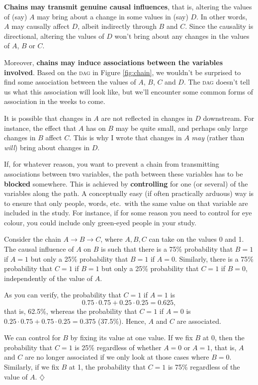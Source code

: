 \documentclass[a4paper]{tufte-book}\usepackage[]{graphicx}\usepackage[]{xcolor}
\newcommand{\term}[1]{\textbf{#1}}
\newcommand*{\parend}[1][$\diamondsuit$]{%
  \unskip\nobreak\hspace{1em plus 1fill}$\diamondsuit$%
}
\begin{document}
\textbf{Chains may transmit genuine causal influences}, that is, altering the values
of (say) $A$ may bring about a change in some values in (say) $D$. In other words,
$A$ may causally affect $D$, albeit indirectly through $B$ and $C$.
Since the causality is directional, altering the
values of $D$ won't bring about any changes in the values of $A$, $B$ or $C$.

Moreover, \textbf{chains may induce associations between the variables involved}.
Based on the \textsc{dag} in Figure \ref{fig:chain}, we wouldn't be surprised
to find some association
between the values of $A$, $B$, $C$ and $D$. The \textsc{dag}
doesn't tell us what this association will look like, but we'll encounter
some common forms of association in the weeks to come.

It is possible that changes in $A$ are not reflected in changes
in $D$ downstream.
For instance, the effect that $A$ has on $B$ may be quite small,
and perhaps only large changes in $B$ affect $C$.
This is why I wrote that changes in $A$ \emph{may} (rather than \emph{will})
bring about changes in $D$.

If, for whatever reason,
you want to prevent a chain from transmitting associations between two variables,
the path between these variables has to be \term{blocked} somewhere.
This is achieved by \term{controlling} for one (or several) of the variables
along the path.
A conceptually easy (if often practically arduous) way is to ensure that
only people, words, etc.\ with the same value on that variable are included in the
study.
For instance, if for some reason you need to control for eye colour, you could include
only green-eyed people in your study.

  Consider the chain $A \rightarrow B \rightarrow C$,
  where $A, B, C$ can take on the values 0 and 1.
  The causal influence of $A$ on $B$ is such that 
  there is a 75\% probability that $B = 1$ if $A = 1$
  but only a 25\% probability that $B = 1$ if $A = 0$.
  Similarly, there is a 75\% probability that $C = 1$ if $B = 1$
  but only a 25\% probability that $C = 1$ if $B = 0$,
  independently of the value of $A$.
  
  As you can verify, the probability that $C = 1$ if $A = 1$
  is 
  $$0.75 \cdot 0.75 + 0.25 \cdot 0.25 = 0.625,$$
  that is, 62.5\%,
  whereas the probability that $C = 1$ if $A = 0$
  is $0.25 \cdot 0.75 + 0.75 \cdot 0.25 = 0.375$ (37.5\%).
  Hence, $A$ and $C$ are associated.
  
  We can control for $B$ by fixing its value at one value.
  If we fix $B$ at 0, then the probability
  that $C = 1$ is 25\% regardless of whether $A = 0$ or $A = 1$,
  that is, $A$ and $C$ are no longer associated if we only look at those 
  cases where $B = 0$.
  Similarly, if we fix $B$ at 1, the probability
  that $C = 1$ is 75\% regardless of the value of $A$.
\parend
\end{document}
